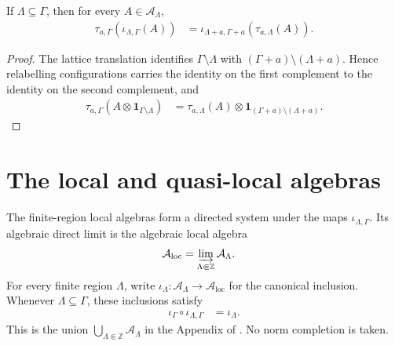 \begin{lemma}
    \label{lem:qca_finite_local_translation_naturality}
    \leanok
    If $\Lambda\subseteq\Gamma$, then for every
    $A\in\mathcal A_\Lambda$,
    \begin{align}
        \tau_{a,\Gamma}(\iota_{\Lambda,\Gamma}(A))
         & =\iota_{\Lambda+a,\Gamma+a}(\tau_{a,\Lambda}(A)).
    \end{align}
\end{lemma}

\begin{proof}\leanok
    The lattice translation identifies $\Gamma\setminus\Lambda$ with
    $(\Gamma+a)\setminus(\Lambda+a)$. Hence relabelling configurations
    carries the identity on the first complement to the identity on the
    second complement, and
    \begin{align}
        \tau_{a,\Gamma}(A\otimes\mathbf 1_{\Gamma\setminus\Lambda})
         & =\tau_{a,\Lambda}(A)
        \otimes\mathbf 1_{(\Gamma+a)\setminus(\Lambda+a)}.
    \end{align}
\end{proof}

\section{The local and quasi-local algebras}

\begin{definition}
    \label{def:qca_algebraic_local_algebra}
    \leanok
    The finite-region local algebras form a directed system under the maps
    $\iota_{\Lambda,\Gamma}$.  Its algebraic direct limit is the algebraic
    local algebra
    \begin{align}
        \mathcal A_{\mathrm{loc}}
         & =\varinjlim_{\Lambda\Subset\mathbb Z}\mathcal A_\Lambda.
    \end{align}
    For every finite region $\Lambda$, write
    $\iota_\Lambda\colon\mathcal A_\Lambda\to\mathcal A_{\mathrm{loc}}$
    for the canonical inclusion.  Whenever $\Lambda\subseteq\Gamma$, these
    inclusions satisfy
    \begin{align}
        \iota_\Gamma\circ\iota_{\Lambda,\Gamma} & =\iota_\Lambda.
    \end{align}
    This is the union
    $\bigcup_{\Lambda\Subset\mathbb Z}\mathcal A_\Lambda$ in the Appendix of
    \cite{Cirac2017MPU}.  No norm completion is taken.
\end{definition}

